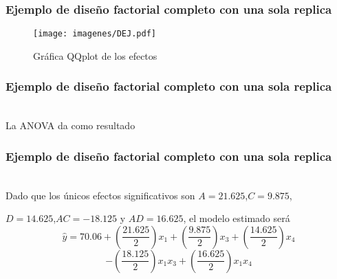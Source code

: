 \documentclass[12pt]{beamer}
\begin{document}
\begin{frame}
\frametitle{Ejemplo de diseño factorial completo con una sola replica}

\begin{figure}[h!]
  \centering
  \texttt{[image: imagenes/DEJ.pdf]}
  \caption{Gráfica QQplot de los efectos}
\end{figure}

\end{frame}

\begin{frame}
\frametitle{Ejemplo de diseño factorial completo con una sola replica}
~\\La ANOVA da como resultado
\begin{table}[H]
  \centering
  \caption{Análisis de varianza una sola réplica}
  \label{tab:addlabel}%
\end{table}%
\end{frame}

\begin{frame}
\frametitle{Ejemplo de diseño factorial completo con una sola replica}
~\\Dado que los únicos efectos significativos son $A=21.625$,$C=9.875$,

$D=14.625$,$AC=-18.125$ y $AD=16.625$, el modelo estimado será
$$\hat{y}=70.06+\left(\frac{21.625}{2}\right)x_1+\left(\frac{9.875}{2}\right)x_3+\left(\frac{14.625}{2}\right)x_4$$
$$-\left(\frac{18.125}{2}\right)x_1x_3+\left(\frac{16.625}{2}\right)x_1x_4$$
\end{frame}
\end{document}
